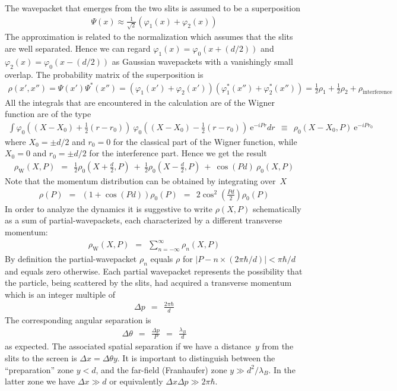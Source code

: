 \documentclass[onecolumn,fleqn]{revtex4}
\newcommand{\eexp}{\mathrm{e}^}
\newcommand{\tbox}[1]{\text{#1}}
\newcommand{\beq}{\begin{eqnarray}}
\newcommand{\eeq}{\end{eqnarray}}
\begin{document}
The wavepacket that emerges from the 
two slits is assumed to be a superposition 
\beq
\Psi(x) \approx \frac{1}{\sqrt{2}} (\varphi_1(x)+\varphi_2(x)) 
\eeq
The approximation is related to the normalization 
which assumes that the slits are well separated.
Hence we can regard ${ \varphi_1(x) = \varphi_0(x+(d/2)) }$  
and ${ \varphi_2(x) = \varphi_0(x-(d/2)) }$
as Gaussian wavepackets with a vanishingly small overlap. 
The probability matrix of the superposition is 
\beq
\rho(x',x'')
= \Psi(x')\Psi^*(x'') 
= (\varphi_1(x')+\varphi_2(x'))(\varphi_1^*(x'')+\varphi_2^*(x''))
=\frac{1}{2}\rho_1+\frac{1}{2}\rho_2+\rho_{\tbox{interference}}
\eeq
All the integrals that are encountered in the calculation are 
of the Wigner function are of the type 
\beq
\int 
\varphi_0\left((X-X_0)+\frac{1}{2}(r-r_0)\right) 
\ \varphi_0\left((X-X_0)-\frac{1}{2}(r-r_0)\right) 
\ \eexp{-iPr} dr 
\ \ \equiv \ \ 
\rho_0(X-X_0,P) \ \eexp{-iPr_0}  
\eeq 
where $X_0=\pm d/2$  and $r_0=0$ for the 
classical part of the Wigner function, 
while $X_0=0$ and  $r_0=\pm d/2$ 
for the interference part.  
Hence we get the result   
\beq
\rho_{\tbox{W}}(X,P)
\ \ = \ \ \frac{1}{2}\rho_0\left(X+\frac{d}{2},P\right)
\ + \ \frac{1}{2}\rho_0\left(X-\frac{d}{2},P\right)
\ + \ \cos(Pd) \ \rho_0(X,P)
\eeq
Note that the momentum distribution can be obtained by integrating over~$X$
\beq
\rho(P) \ \ = \ \ (1+\cos(Pd)) \rho_0(P) \ \ = \ \ 2\cos^2(\frac{Pd}{2})\rho_0(P)
\eeq
In order to analyze the dynamics it is suggestive to write $\rho(X,P)$ 
schematically as a sum of partial-wavepackets, each characterized   
by a different transverse momentum:
\beq
\rho_{\tbox{W}}(X,P) \ \ = \ \ \sum_{n=-\infty}^{\infty} \rho_{n}(X,P)
\eeq
By definition the partial-wavepacket $\rho_{n}$  
equals $\rho$ for $|P-n\times(2\pi\hbar/d)| < \pi\hbar/d$ 
and equals zero otherwise. Each partial wavepacket 
represents the possibility that the particle, being 
scattered by the slits,  
had acquired a transverse momentum which is 
an integer multiple of 
\beq
\Delta p \ \ = \ \ \frac{2\pi\hbar}{d}
\eeq
The corresponding angular separation is 
\beq
\Delta\theta \ \ = \ \ \frac{\Delta p}{P} \ \ = \ \ \frac{\lambda_B}{d}
\eeq
as expected. The associated spatial separation 
if we have a distance~$y$ from the slits to the screen 
is ${\Delta x = \Delta\theta y}$. 
It is important to distinguish between the 
``preparation'' zone $y<d$, and the far-field 
(Franhaufer) zone $y \gg d^2/\lambda_B$.  
In the latter zone we have ${\Delta x \gg d}$ 
or equivalently ${\Delta x\Delta p \gg 2\pi\hbar}$.
\end{document}
